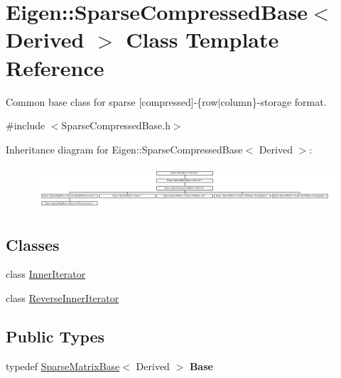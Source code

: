 \hypertarget{class_eigen_1_1_sparse_compressed_base}{}\section{Eigen\+::Sparse\+Compressed\+Base$<$ Derived $>$ Class Template Reference}
\label{class_eigen_1_1_sparse_compressed_base}


Common base class for sparse \mbox{[}compressed\mbox{]}-\/\{row$\vert$column\}-\/storage format.  




{\ttfamily \#include $<$Sparse\+Compressed\+Base.\+h$>$}

Inheritance diagram for Eigen\+::Sparse\+Compressed\+Base$<$ Derived $>$\+:\begin{figure}[H]
\begin{center}
\leavevmode
\includegraphics[height=1.623188cm]{class_eigen_1_1_sparse_compressed_base}
\end{center}
\end{figure}
\subsection*{Classes}
\begin{DoxyCompactItemize}
\item 
class \mbox{\hyperlink{class_eigen_1_1_sparse_compressed_base_1_1_inner_iterator}{Inner\+Iterator}}
\item 
class \mbox{\hyperlink{class_eigen_1_1_sparse_compressed_base_1_1_reverse_inner_iterator}{Reverse\+Inner\+Iterator}}
\end{DoxyCompactItemize}
\subsection*{Public Types}
\begin{DoxyCompactItemize}
\item 
\mbox{\label{class_eigen_1_1_sparse_compressed_base_a4da19e5347a0db1b4f56bac77c1e9afb}} 
typedef \mbox{\hyperlink{class_eigen_1_1_sparse_matrix_base}{Sparse\+Matrix\+Base}}$<$ Derived $>$ {\bfseries Base}
\end{DoxyCompactItemize}
